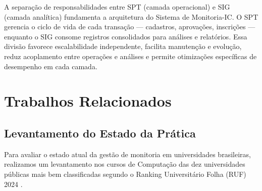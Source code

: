 \documentclass[portuguese]{sbc2025}%
\begin{document}
A separação de responsabilidades entre SPT (camada operacional) e SIG (camada analítica) fundamenta a arquitetura do Sistema de Monitoria-IC. O SPT gerencia o ciclo de vida de cada transação — cadastros, aprovações, inscrições — enquanto o SIG consome registros consolidados para análises e relatórios. Essa divisão favorece escalabilidade independente, facilita manutenção e evolução, reduz acoplamento entre operações e análises e permite otimizações específicas de desempenho em cada camada.


\section{Trabalhos Relacionados}
\label{sec:related-work}


\subsection{Levantamento do Estado da Prática}

Para avaliar o estado atual da gestão de monitoria em universidades brasileiras, realizamos um levantamento nos cursos de Computação das dez universidades públicas mais bem classificadas segundo o Ranking Universitário Folha (RUF) 2024 \cite{folha2024ruf}.
\end{document}

